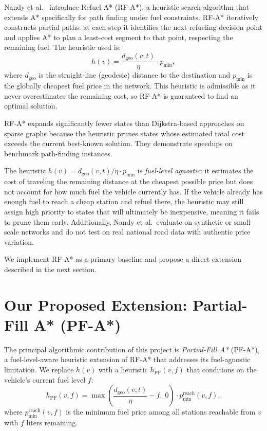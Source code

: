 Nandy et al.~\cite{nandy2023} introduce Refuel A* (RF-A*), a heuristic search algorithm
that extends A* specifically for path finding under fuel constraints.
RF-A* iteratively constructs partial paths: at each step it identifies the next refueling
decision point and applies A* to plan a least-cost segment to that point, respecting the
remaining fuel.
The heuristic used is:
\[
    h(v) = \frac{d_{\mathrm{geo}}(v, t)}{\eta} \cdot p_{\min},
\]
where $d_{\mathrm{geo}}$ is the straight-line (geodesic) distance to the destination and
$p_{\min}$ is the globally cheapest fuel price in the network.
This heuristic is admissible as it never overestimates the remaining cost, so RF-A* is
guaranteed to find an optimal solution.

RF-A* expands significantly fewer states than Dijkstra-based approaches on sparse graphs
because the heuristic prunes states whose estimated total cost exceeds the current
best-known solution.
They demonstrate speedups on benchmark path-finding instances.

The heuristic $h(v) = d_{\mathrm{geo}}(v,t)/\eta \cdot p_{\min}$ is \emph{fuel-level agnostic}:
it estimates the cost of traveling the remaining distance at the cheapest possible price but
does not account for how much fuel the vehicle currently has.
If the vehicle already has enough fuel to reach a cheap station and refuel there, the heuristic
may still assign high priority to states that will ultimately be inexpensive, meaning it fails to
prune them early.
Additionally, Nandy et al.\ evaluate on synthetic or small-scale networks and do not test on
real national road data with authentic price variation.

We implement RF-A* as a primary baseline and propose a direct extension described in the
next section.

\section{Our Proposed Extension: Partial-Fill A* (PF-A*)}
\label{sec:pfa_overview}

The principal algorithmic contribution of this project is \textit{Partial-Fill A*} (PF-A*), a
fuel-level-aware heuristic extension of RF-A* that addresses its fuel-agnostic limitation.
We replace $h(v)$ with a heuristic $h_{\mathrm{PF}}(v, f)$ that conditions on the vehicle's
current fuel level $f$:
\[
    h_{\mathrm{PF}}(v, f)
    = \max\!\left(\frac{d_{\mathrm{geo}}(v, t)}{\eta} - f,\; 0\right)
      \cdot p_{\min}^{\mathrm{reach}}(v, f),
\]
where $p_{\min}^{\mathrm{reach}}(v, f)$ is the minimum fuel price among all stations reachable
from $v$ with $f$ liters remaining.

